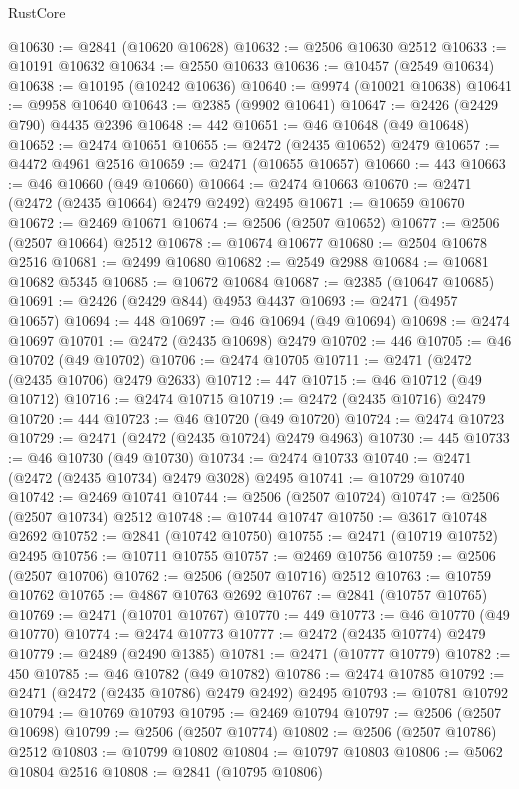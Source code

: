 \begin{lexlean}{RustCore}
\begin{coremodule}
@10630 := @2841 (@10620 @10628)
@10632 := @2506 @10630 @2512
@10633 := @10191 @10632
@10634 := @2550 @10633
@10636 := @10457 (@2549 @10634)
@10638 := @10195 (@10242 @10636)
@10640 := @9974 (@10021 @10638)
@10641 := @9958 @10640
@10643 := @2385 (@9902 @10641)
@10647 := @2426 (@2429 @790) @4435 @2396
@10648 := 442
@10651 := @46 @10648 (@49 @10648)
@10652 := @2474 @10651
@10655 := @2472 (@2435 @10652) @2479
@10657 := @4472 @4961 @2516
@10659 := @2471 (@10655 @10657)
@10660 := 443
@10663 := @46 @10660 (@49 @10660)
@10664 := @2474 @10663
@10670 := @2471 (@2472 (@2435 @10664) @2479 @2492) @2495
@10671 := @10659 @10670
@10672 := @2469 @10671
@10674 := @2506 (@2507 @10652)
@10677 := @2506 (@2507 @10664) @2512
@10678 := @10674 @10677
@10680 := @2504 @10678 @2516
@10681 := @2499 @10680
@10682 := @2549 @2988
@10684 := @10681 @10682 @5345
@10685 := @10672 @10684
@10687 := @2385 (@10647 @10685)
@10691 := @2426 (@2429 @844) @4953 @4437
@10693 := @2471 (@4957 @10657)
@10694 := 448
@10697 := @46 @10694 (@49 @10694)
@10698 := @2474 @10697
@10701 := @2472 (@2435 @10698) @2479
@10702 := 446
@10705 := @46 @10702 (@49 @10702)
@10706 := @2474 @10705
@10711 := @2471 (@2472 (@2435 @10706) @2479 @2633)
@10712 := 447
@10715 := @46 @10712 (@49 @10712)
@10716 := @2474 @10715
@10719 := @2472 (@2435 @10716) @2479
@10720 := 444
@10723 := @46 @10720 (@49 @10720)
@10724 := @2474 @10723
@10729 := @2471 (@2472 (@2435 @10724) @2479 @4963)
@10730 := 445
@10733 := @46 @10730 (@49 @10730)
@10734 := @2474 @10733
@10740 := @2471 (@2472 (@2435 @10734) @2479 @3028) @2495
@10741 := @10729 @10740
@10742 := @2469 @10741
@10744 := @2506 (@2507 @10724)
@10747 := @2506 (@2507 @10734) @2512
@10748 := @10744 @10747
@10750 := @3617 @10748 @2692
@10752 := @2841 (@10742 @10750)
@10755 := @2471 (@10719 @10752) @2495
@10756 := @10711 @10755
@10757 := @2469 @10756
@10759 := @2506 (@2507 @10706)
@10762 := @2506 (@2507 @10716) @2512
@10763 := @10759 @10762
@10765 := @4867 @10763 @2692
@10767 := @2841 (@10757 @10765)
@10769 := @2471 (@10701 @10767)
@10770 := 449
@10773 := @46 @10770 (@49 @10770)
@10774 := @2474 @10773
@10777 := @2472 (@2435 @10774) @2479
@10779 := @2489 (@2490 @1385)
@10781 := @2471 (@10777 @10779)
@10782 := 450
@10785 := @46 @10782 (@49 @10782)
@10786 := @2474 @10785
@10792 := @2471 (@2472 (@2435 @10786) @2479 @2492) @2495
@10793 := @10781 @10792
@10794 := @10769 @10793
@10795 := @2469 @10794
@10797 := @2506 (@2507 @10698)
@10799 := @2506 (@2507 @10774)
@10802 := @2506 (@2507 @10786) @2512
@10803 := @10799 @10802
@10804 := @10797 @10803
@10806 := @5062 @10804 @2516
@10808 := @2841 (@10795 @10806)

\end{coremodule}
\end{lexlean}
